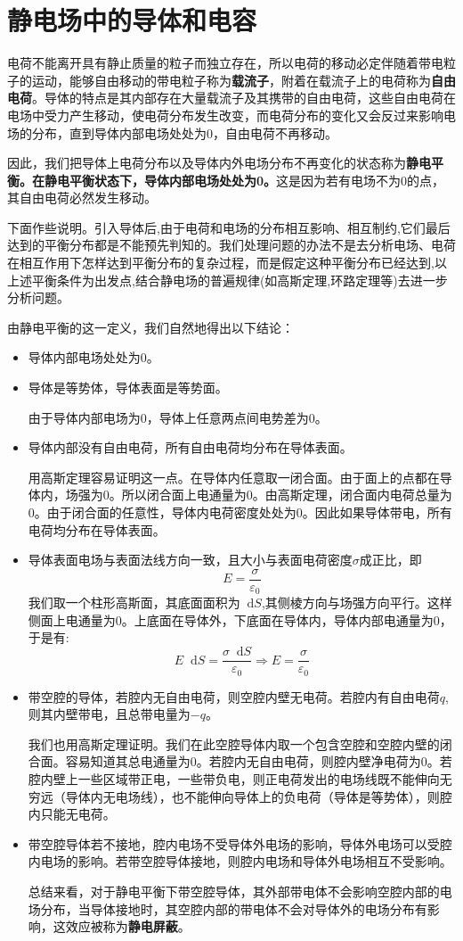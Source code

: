 \documentclass[12pt,a4paper,oneside]{report}
\theoremstyle{definition}
\theoremstyle{remark}
\renewcommand{\d}{\mathop{}\!\mathrm{d}}
\begin{document}
\section{静电场中的导体和电容}
电荷不能离开具有静止质量的粒子而独立存在，所以电荷的移动必定伴随着带电粒子的运动，能够自由移动的带电粒子称为\textbf{载流子}，附着在载流子上的电荷称为\textbf{自由电荷}。导体的特点是其内部存在大量载流子及其携带的自由电荷，这些自由电荷在电场中受力产生移动，使电荷分布发生改变，而电荷分布的变化又会反过来影响电场的分布，直到导体内部电场处处为0，自由电荷不再移动。

因此，我们把导体上电荷分布以及导体内外电场分布不再变化的状态称为\textbf{静电平衡。在静电平衡状态下，导体内部电场处处为0。}这是因为若有电场不为0的点，其自由电荷必然发生移动。

下面作些说明。引入导体后,由于电荷和电场的分布相互影响、相互制约,它们最后达到的平衡分布都是不能预先判知的。我们处理问题的办法不是去分析电场、电荷在相互作用下怎样达到平衡分布的复杂过程，而是假定这种平衡分布已经达到,以上述平衡条件为出发点,结合静电场的普遍规律(如高斯定理,环路定理等)去进一步分析问题。

由静电平衡的这一定义，我们自然地得出以下结论：
\begin{itemize}
  \item 导体内部电场处处为0。
  \item 导体是等势体，导体表面是等势面。
  
  由于导体内部电场为0，导体上任意两点间电势差为0。
  \item 导体内部没有自由电荷，所有自由电荷均分布在导体表面。
  
  用高斯定理容易证明这一点。在导体内任意取一闭合面。由于面上的点都在导体内，场强为0。所以闭合面上电通量为0。由高斯定理，闭合面内电荷总量为0。由于闭合面的任意性，导体内电荷密度处处为0。因此如果导体带电，所有电荷均分布在导体表面。

  \item 导体表面电场与表面法线方向一致，且大小与表面电荷密度$\sigma$成正比，即
  \[
  E = \frac{\sigma}{\varepsilon_0}
  \]
  我们取一个柱形高斯面，其底面面积为$\d S$,其侧棱方向与场强方向平行。这样侧面上电通量为0。上底面在导体外，下底面在导体内，导体内部电通量为0，于是有:
  \[
  E \d S = \frac{\sigma \d S}{\varepsilon_0}
  \Rightarrow E = \frac{\sigma}{\varepsilon_0}
  \]

  \item 带空腔的导体，若腔内无自由电荷，则空腔内壁无电荷。若腔内有自由电荷$q$,则其内壁带电，且总带电量为$-q$。
  
  我们也用高斯定理证明。我们在此空腔导体内取一个包含空腔和空腔内壁的闭合面。容易知道其总电通量为0。若腔内无自由电荷，则腔内壁净电荷为0。若腔内壁上一些区域带正电，一些带负电，则正电荷发出的电场线既不能伸向无穷远（导体内无电场线），也不能伸向导体上的负电荷（导体是等势体），则腔内只能无电荷。

  \item 带空腔导体若不接地，腔内电场不受导体外电场的影响，导体外电场可以受腔内电场的影响。若带空腔导体接地，则腔内电场和导体外电场相互不受影响。
  
  总结来看，对于静电平衡下带空腔导体，其外部带电体不会影响空腔内部的电场分布，当导体接地时，其空腔内部的带电体不会对导体外的电场分布有影响，这效应被称为\textbf{静电屏蔽}。
\end{itemize}
\end{document}
